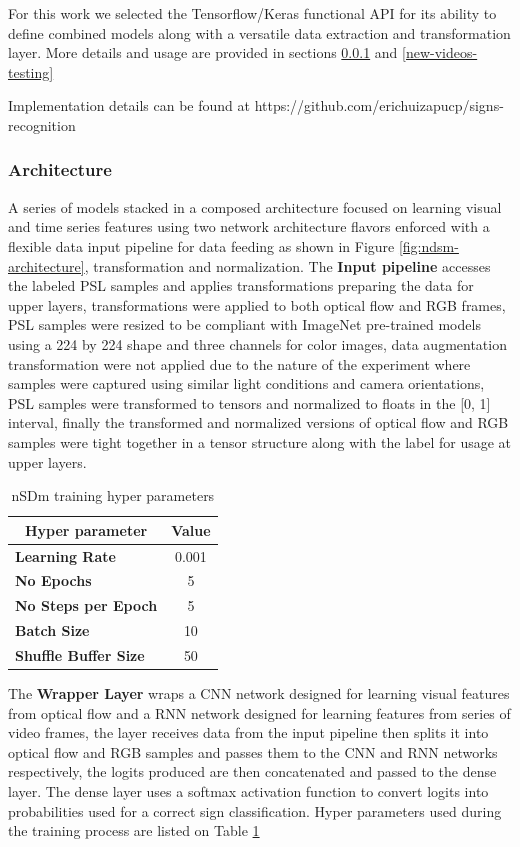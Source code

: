 \documentclass[twocolumn,conference]{article}
\begin{document}
For this work we selected the Tensorflow/Keras functional API for its ability to define combined models along with a versatile data extraction and transformation layer. More details and usage are provided in sections \ref{nsdm-architecture} and \ref{new-videos-testing}

Implementation details can be found at https://github.com/erichuizapucp/signs-recognition
\subsubsection{Architecture}\label{nsdm-architecture}
A series of models stacked in a composed architecture focused on learning visual and time series features using two network architecture flavors enforced with a flexible data input pipeline for data feeding as shown in Figure \ref{fig:ndsm-architecture}, transformation and normalization. The \textbf{Input pipeline} accesses the labeled PSL samples and applies transformations preparing the data for upper layers, transformations were applied to both optical flow and RGB frames, PSL samples were resized to be compliant with ImageNet pre-trained models using a 224 by 224 shape and three channels for color images, data augmentation transformation were not applied due to the nature of the experiment where samples were captured using similar light conditions and camera orientations, PSL samples were transformed to tensors and normalized to floats in the [0, 1] interval, finally the transformed and normalized versions of optical flow and RGB samples were tight together in a tensor structure along with the label for usage at upper layers.
\begin{table}[!htb]
\captionsetup{size=footnotesize}
\begin{tabular}{ p{16em} c}
\toprule
\multicolumn{1}{c}{\textbf{Hyper parameter}} & 
	\multicolumn{1}{c}{\textbf{Value}}\\
\midrule
\textbf{Learning Rate}&	0.001\\
\textbf{No Epochs}&	5\\
\textbf{No Steps per Epoch}&	5\\
\textbf{Batch Size}&	10\\
\textbf{Shuffle Buffer Size}&	50\\
\bottomrule
\end{tabular}
\caption{nSDm training hyper parameters} \label{tab:nSDm-hyperparams}
\end{table}
The \textbf{Wrapper Layer} wraps a CNN network designed for learning visual features from optical flow and a RNN network designed for learning features from series of video frames, the layer receives data from the input pipeline then splits it into optical flow and RGB samples and passes them to the CNN and RNN networks respectively, the logits  produced are then concatenated and passed to the dense layer.
The dense layer uses a softmax activation function to convert logits into probabilities used for a correct sign classification. Hyper parameters used during the training process are listed on Table \ref{tab:nSDm-hyperparams}
\end{document}
